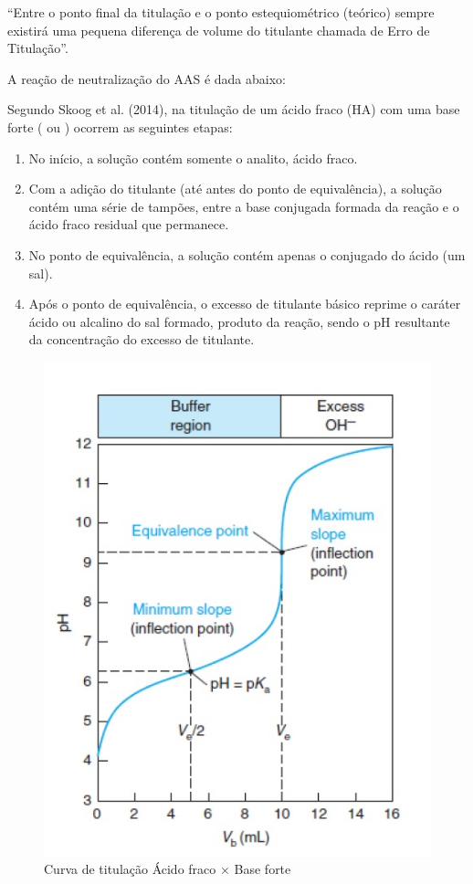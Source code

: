 “Entre o ponto final da titulação e o ponto estequiométrico (teórico) sempre existirá uma pequena
diferença de volume do titulante chamada de Erro de Titulação”.~\cite{Ruy1999}

A reação de neutralização do AAS é dada abaixo:

\begin{center}
\end{center} 

Segundo Skoog et al. (2014), na titulação de um ácido fraco (HA) com uma base forte ( ou
) ocorrem as seguintes etapas:

\begin{enumerate}
    \item No início, a solução contém somente o analito, ácido fraco.
    \item Com a adição do titulante (até antes do ponto de equivalência), a solução contém uma série
        de tampões, entre a base conjugada formada da reação e o ácido fraco residual que permanece.
    \item No ponto de equivalência, a solução contém apenas o conjugado do ácido (um sal).
    \item Após o ponto de equivalência, o excesso de titulante básico reprime o caráter ácido ou
        alcalino do sal formado, produto da reação, sendo o pH resultante da concentração do excesso
        de titulante.
\end{enumerate}

\begin{figure}[H]
\begin{center}
    \includegraphics[scale=.9]{figuras/titulacao.jpg}
\end{center}
\caption{Curva de titulação Ácido fraco $\times$ Base forte}
\label{fig:curva_titulacao}
\end{figure}

